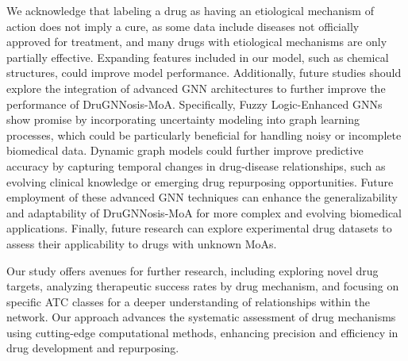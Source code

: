 \documentclass[journal,twoside,web]{ieeecolor}
\begin{document}
We acknowledge that labeling a drug as having an etiological mechanism of action does not imply a cure, as some data include diseases not officially approved for treatment, and many drugs with etiological mechanisms are only partially effective. 
Expanding features included in our model, such as chemical structures, could improve model performance.
Additionally, future studies should explore the integration of advanced GNN architectures to further improve the performance of DruGNNosis-MoA. 
Specifically, Fuzzy Logic-Enhanced GNNs \cite{yang2023fuzzy} show promise by incorporating uncertainty modeling into graph learning processes, which could be particularly beneficial for handling noisy or incomplete biomedical data.
Dynamic graph models could further improve predictive accuracy by capturing temporal changes in drug-disease relationships, such as evolving clinical knowledge or emerging drug repurposing opportunities.
Future employment of these advanced GNN techniques can enhance the generalizability and adaptability of DruGNNosis-MoA for more complex and evolving biomedical applications.
Finally, future research can explore experimental drug datasets to assess their applicability to drugs with unknown MoAs.


Our study offers avenues for further research, including exploring novel drug targets, analyzing therapeutic success rates by drug mechanism, and focusing on specific ATC classes for a deeper understanding of relationships within the network.
Our approach advances the systematic assessment of drug mechanisms using cutting-edge computational methods, enhancing precision and efficiency in drug development and repurposing.



\end{document}
